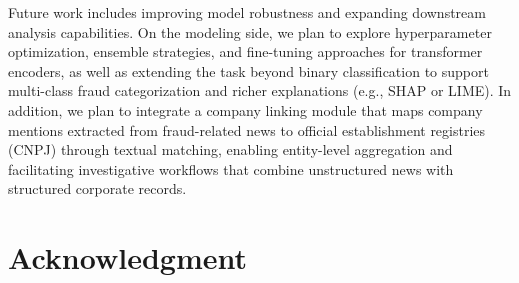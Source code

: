 \documentclass[conference]{IEEEtran}
\begin{document}

Future work includes improving model robustness and expanding downstream analysis capabilities. On the modeling side, we plan to explore hyperparameter optimization, ensemble strategies, and fine-tuning approaches for transformer encoders, as well as extending the task beyond binary classification to support multi-class fraud categorization and richer explanations (e.g., SHAP or LIME). In addition, we plan to integrate a company linking module that maps company mentions extracted from fraud-related news to official establishment registries (CNPJ) through textual matching, enabling entity-level aggregation and facilitating investigative workflows that combine unstructured news with structured corporate records.

\section*{Acknowledgment}




\end{document}
